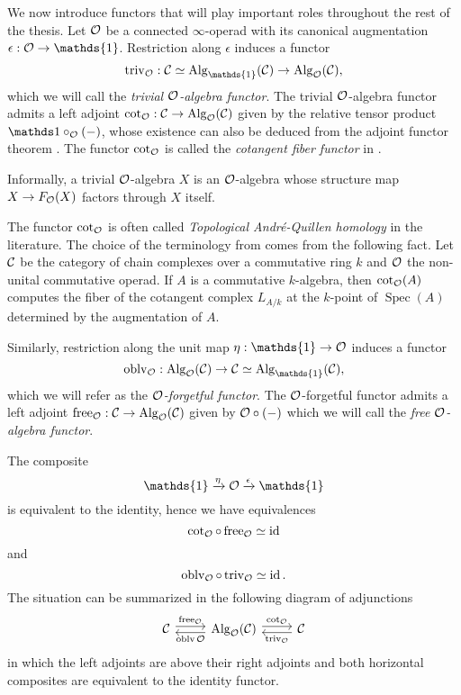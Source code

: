 We now introduce functors that will play important roles throughout the rest of the thesis. 
Let ${\mathcal{O}}$ be a connected $\infty$-operad with its canonical augmentation $\epsilon:\CO\rightarrow \mathds{1}$.
Restriction along $\epsilon$ induces a functor 
$$
\trivial_{\CO}: \CC\simeq\Alg_{\mathds{1}}(\CC)\rightarrow \Alg_{\CO}(\CC),
$$
which we will call the \emph{trivial ${\mathcal{O}}$-algebra functor}.
The trivial ${\mathcal{O}}$-algebra functor admits a left adjoint $\cot_{{\mathcal{O}}}:{\mathcal{C}}\rightarrow \operatorname{Alg}_{{\mathcal{O}}}({\mathcal{C}})$ given by the relative tensor product $\triv\circ_{\CO}(-)$, whose existence can also be deduced from the adjoint functor theorem \cite[Corollary 5.5.2.9.]{HTT}. 
The functor $\cot_{{\mathcal{O}}}$ is called the \emph{cotangent fiber functor} in \cite{Heuts_Koszul}. 
\begin{remark}
Informally, a trivial ${\mathcal{O}}$-algebra $X$ is an ${\mathcal{O}}$-algebra whose structure map 
$X\to F_{{\mathcal{O}}}(X)$ factors through $X$ itself.
\end{remark}

\begin{remark}
The functor $\cot_{{\mathcal{O}}}$ is often called \emph{Topological Andr\'e-Quillen homology} in the literature. The choice of the terminology from \cite{Heuts_Koszul}
comes from the following fact.
Let ${\mathcal{C}}$ be the category of chain complexes over a commutative ring $k$ and ${\mathcal{O}}$ the non-unital commutative operad. If $A$ is a commutative $k$-algebra, then $\cot_{{\mathcal{O}}}(A)$ computes the fiber of the cotangent complex $L_{A/k}$ at the $k$-point of $\operatorname{Spec}(A)$ determined by the augmentation of $A$.
\end{remark}


Similarly, restriction along the unit map $\eta:\mathds{1}\rightarrow \CO$ induces a functor
$$
\oblv_{\CO}: \Alg_{\CO}(\CC)
\rightarrow 
\CC\simeq\Alg_{\mathds{1}}(\CC),
$$
which we will refer as the \emph{${\mathcal{O}}$-forgetful functor}.
The ${\mathcal{O}}$-forgetful functor admits a left adjoint $\operatorname{free}_{{\mathcal{O}}}:{\mathcal{C}}\rightarrow \operatorname{Alg}_{{\mathcal{O}}}({\mathcal{C}})$ given by ${\mathcal{O}}\circ (-)$ which we will call the \emph{free ${\mathcal{O}}$-algebra functor}.
    
The composite
$$
\mathds{1}\xrightarrow{\eta} \CO \xrightarrow{\epsilon} \mathds{1}
$$
is equivalent to the identity, hence we have equivalences
$$
\cot_{{\mathcal{O}}} \circ \operatorname{free}_{{\mathcal{O}}} \simeq \operatorname{id}
$$
and 
$$
\operatorname{oblv}_{{\mathcal{O}}}\circ \operatorname{triv}_{{\mathcal{O}}} \simeq \operatorname{id}.
$$
The situation can be summarized in the following diagram of adjunctions
\[
\begin{tikzcd}
\CC & \Alg_{\CO}(\CC) & \CC
	\arrow[from=1-1, to= 1-2, shift left = 1, "\Free_{\CO}" above]
	\arrow[from=1-2, to=1-1, shift left = 1, "\oblv{\CO}" below]
	\arrow[from=1-2, to= 1-3, shift left = 1, "\cot_{\CO}" above]
	\arrow[from=1-3, to=1-2, shift left = 1, "\trivial_{\CO}" below]
\end{tikzcd}
\]
in which the left adjoints are above their right adjoints and both horizontal composites are equivalent to the identity functor.

